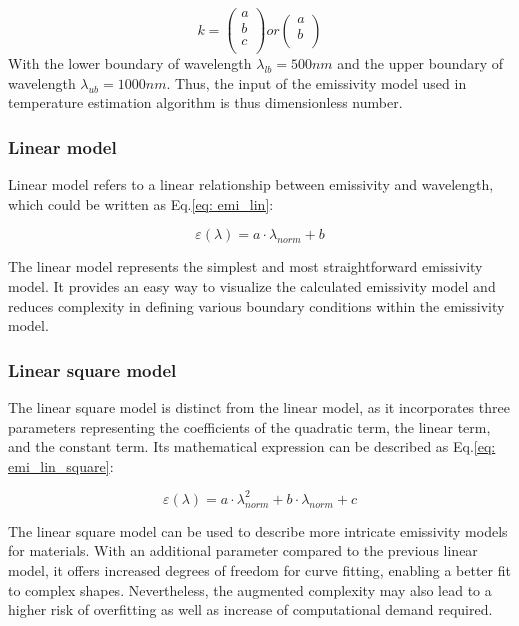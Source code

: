 \begin{equation}
  \label{eq: k_vec}
  k = \begin{pmatrix}
    a \\
    b \\
    c \\
    \end{pmatrix} 
    or 
    \begin{pmatrix}
      a \\
      b \\
      \end{pmatrix}
\end{equation}
With the lower boundary of wavelength $\lambda_{lb} = 500 {nm}$ and the 
upper boundary of wavelength $\lambda_{ub} = 1000 {nm}$. Thus, the input 
of the emissivity model used in temperature estimation algorithm is thus 
dimensionless number.

\subsubsection{Linear model}
Linear model refers to a linear relationship between emissivity and wavelength,
which could be written as Eq.\ref{eq: emi_lin}:

\begin{equation}
  \label{eq: emi_lin}
  \varepsilon(\lambda) = a\cdot \lambda_{norm} + b
\end{equation}

The linear model represents the simplest and most straightforward emissivity model. 
It provides an easy way to visualize the calculated emissivity model 
and reduces complexity in defining various boundary conditions within the 
emissivity model.

\subsubsection{Linear square model}
The linear square model is distinct from the linear model, 
as it incorporates three parameters representing the coefficients 
of the quadratic term, the linear term, and the constant term. Its 
mathematical expression can be described as Eq.\ref{eq: emi_lin_square}:

\begin{equation}
  \label{eq: emi_lin_square}
  \varepsilon(\lambda) = a \cdot \lambda_{norm}^2 + b \cdot \lambda_{norm} + c
\end{equation}

The linear square model can be used to describe more intricate emissivity 
models for materials. With an additional parameter compared to the 
previous linear model, it offers increased degrees of freedom for 
curve fitting, enabling a better fit to complex shapes. Nevertheless, 
the augmented complexity may also lead to a higher risk of overfitting as 
well as increase of computational demand required.

